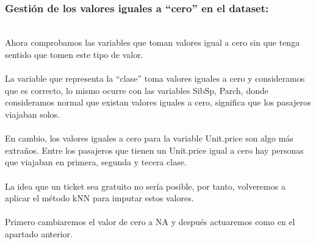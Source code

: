 \documentclass[
]{article}
\newenvironment{Shaded}{\begin{snugshade}}{\end{snugshade}}
\newcommand{\CommentTok}[1]{\textcolor[rgb]{0.56,0.35,0.01}{\textit{#1}}}
\newcommand{\DataTypeTok}[1]{\textcolor[rgb]{0.13,0.29,0.53}{#1}}
\newcommand{\DecValTok}[1]{\textcolor[rgb]{0.00,0.00,0.81}{#1}}
\newcommand{\KeywordTok}[1]{\textcolor[rgb]{0.13,0.29,0.53}{\textbf{#1}}}
\newcommand{\NormalTok}[1]{#1}
\newcommand{\OperatorTok}[1]{\textcolor[rgb]{0.81,0.36,0.00}{\textbf{#1}}}
\newcommand{\OtherTok}[1]{\textcolor[rgb]{0.56,0.35,0.01}{#1}}
\newcommand{\StringTok}[1]{\textcolor[rgb]{0.31,0.60,0.02}{#1}}
\begin{document}
\texttt{}\\
\texttt{}

\hypertarget{gestiuxf3n-de-los-valores-iguales-a-cero-en-el-dataset}{%
\subsubsection{\texorpdfstring{\textbf{Gestión de los valores iguales a
``cero'' en el
dataset}:}{Gestión de los valores iguales a ``cero'' en el dataset:}}\label{gestiuxf3n-de-los-valores-iguales-a-cero-en-el-dataset}}

\texttt{}\\
Ahora comprobamos las variables que toman valores igual a cero sin que
tenga sentido que tomen este tipo de valor.\\
\texttt{}~\\
La variable que representa la ``clase'' toma valores iguales a cero y
consideramos que es correcto, lo mismo ocurre con las variables SibSp,
Parch, donde consideramos normal que existan valores iguales a cero,
significa que los pasajeros viajaban solos.\\
\texttt{}~\\
En cambio, los valores iguales a cero para la variable Unit.price son
algo más extraños. Entre los pasajeros que tienen un Unit.price igual a
cero hay personas que viajaban en primera, segunda y tecera clase.\\
\texttt{}~\\
La idea que un ticket sea gratuito no sería posible, por tanto,
volveremos a aplicar el método kNN para imputar estos valores.\\
\texttt{}~\\
Primero cambiaremos el valor de cero a NA y después actuaremos como en
el apartado anterior. \texttt{}

\begin{Shaded}
\end{Shaded}
\end{document}
